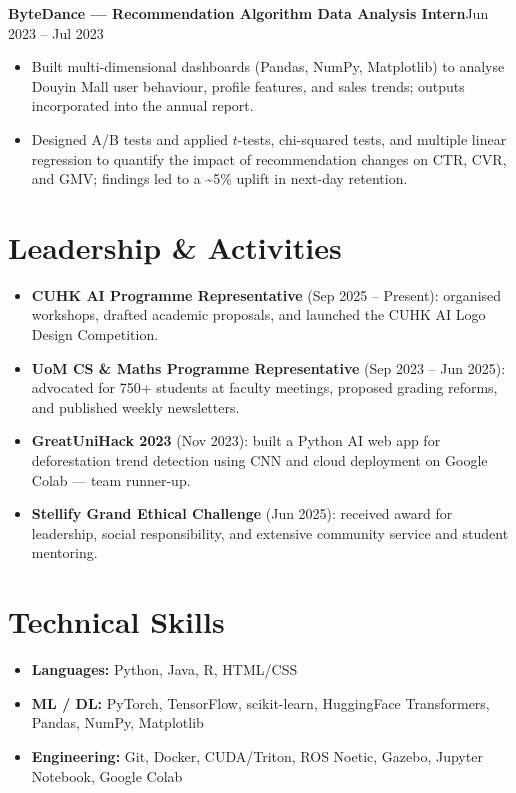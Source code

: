 \documentclass[a4paper,10pt]{article}
\newcommand{\entry}[2]{%
  \noindent\textbf{#1}\hfill#2\par%
}
\begin{document}
\entry{ByteDance --- Recommendation Algorithm Data Analysis Intern}{Jun 2023 -- Jul 2023}
\begin{itemize}
  \item Built multi-dimensional dashboards (Pandas, NumPy, Matplotlib) to analyse Douyin Mall user behaviour, profile features, and sales trends; outputs incorporated into the annual report.
  \item Designed A/B tests and applied $t$-tests, chi-squared tests, and multiple linear regression to quantify the impact of recommendation changes on CTR, CVR, and GMV; findings led to a \textasciitilde5\% uplift in next-day retention.
\end{itemize}

\section*{Leadership \& Activities}

\begin{itemize}
  \item \textbf{CUHK AI Programme Representative} (Sep 2025 -- Present): organised workshops, drafted academic proposals, and launched the CUHK AI Logo Design Competition.
  \item \textbf{UoM CS \& Maths Programme Representative} (Sep 2023 -- Jun 2025): advocated for 750+ students at faculty meetings, proposed grading reforms, and published weekly newsletters.
  \item \textbf{GreatUniHack 2023} (Nov 2023): built a Python AI web app for deforestation trend detection using CNN and cloud deployment on Google Colab --- team runner-up.
  \item \textbf{Stellify Grand Ethical Challenge} (Jun 2025): received award for leadership, social responsibility, and extensive community service and student mentoring.
\end{itemize}

\section*{Technical Skills}

\begin{itemize}
  \item \textbf{Languages:} Python, Java, R, HTML/CSS
  \item \textbf{ML / DL:} PyTorch, TensorFlow, scikit-learn, HuggingFace Transformers, Pandas, NumPy, Matplotlib
  \item \textbf{Engineering:} Git, Docker, CUDA/Triton, ROS Noetic, Gazebo, Jupyter Notebook, Google Colab
\end{itemize}
\end{document}
